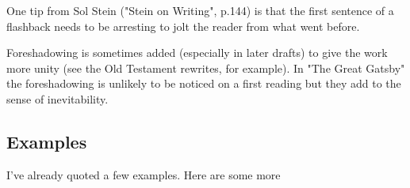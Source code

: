 \documentclass[11pt]{article}
\begin{document}
 
One tip from Sol Stein ("Stein on Writing", p.144) is that the first sentence of a flashback needs to be arresting to jolt the reader from what went before.



Foreshadowing is sometimes added (especially in later drafts) to give the work more unity (see the Old Testament rewrites, for example). In "The Great Gatsby" the foreshadowing is unlikely to be noticed on a first reading but they add to the sense of inevitability.


 
 
\subsection*{Examples}
I've already quoted a few examples. Here are some more
\end{document}
